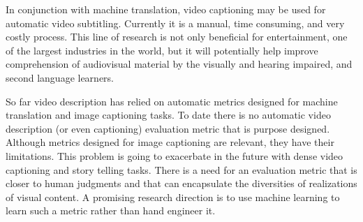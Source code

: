 \documentclass[10pt,journal,compsoc]{IEEEtran}
\begin{document}

\vspace{1mm}
In conjunction with machine translation, video captioning may be used for automatic video subtitling. Currently it is a manual, time consuming, and very costly process. This line of research is not only beneficial for entertainment, one of the largest industries in the world, but it will potentially help improve comprehension of audiovisual material by the visually and hearing impaired, and second language learners.


\vspace{1mm}
So far video description has relied on automatic metrics designed for machine translation and image captioning tasks. To date there is no automatic video description (or even captioning) evaluation metric that is purpose designed. Although metrics designed for image captioning are relevant, they have their limitations. This problem is going to exacerbate in the future with dense video captioning and story telling tasks. There is a need for an evaluation metric that is closer to human judgments and that can encapsulate the diversities of realizations of visual content. A promising research direction is to use machine learning to learn such a metric rather than hand engineer it.
\end{document}
